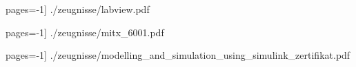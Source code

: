 \documentclass[12pt,a4paper]{scrartcl}
\begin{document}
\newpage
{}

 pages=-1] {./zeugnisse/labview.pdf}


\newpage
 pages=-1] {./zeugnisse/mitx_6001.pdf}


 pages=-1] {./zeugnisse/modelling_and_simulation_using_simulink_zertifikat.pdf}

\end{document}
